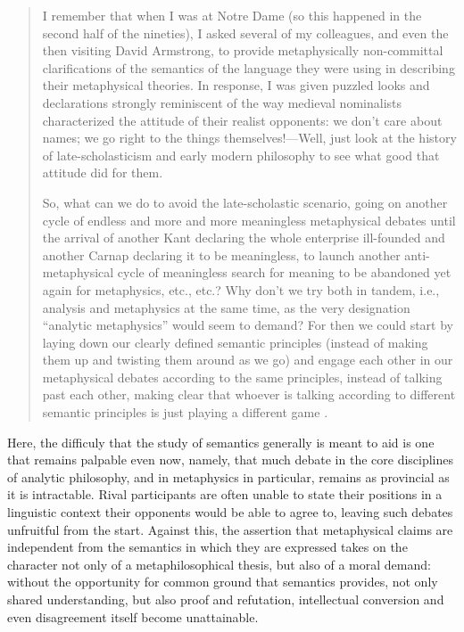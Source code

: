 \documentclass[]{article}
\begin{document}
\begin{quote}
I remember that when I was at Notre Dame (so this happened in the second
half of the nineties), I asked several of my colleagues, and even the then
visiting David Armstrong, to provide metaphysically non-committal
clarifications of the semantics of the language they were using in
describing their metaphysical theories. In response, I was given puzzled
looks and declarations strongly reminiscent of the way medieval
nominalists characterized the attitude of their realist opponents: we don’t
care about names; we go right to the things themselves!—Well, just look 
at the history of late-scholasticism and early modern philosophy to see
what good that attitude did for them.

So, what can we do to avoid the late-scholastic scenario, going on another
cycle of endless and more and more meaningless metaphysical debates
until the arrival of another Kant declaring the whole enterprise ill-founded
and another Carnap declaring it to be meaningless, to launch another anti-
metaphysical cycle of meaningless search for meaning to be abandoned
yet again for metaphysics, etc., etc.? Why don’t we try both in tandem,
i.e., analysis and metaphysics at the same time, as the very designation
“analytic metaphysics” would seem to demand? For then we could start by
laying down our clearly defined semantic principles (instead of making
them up and twisting them around as we go) and engage each other in our
metaphysical debates according to the same principles, instead of talking
past each other, making clear that whoever is talking according to different
semantic principles is just playing a different game \autocite[86-87]{Klima2014}.
\end{quote}

Here, the difficuly that the study of semantics generally is meant to aid is one that remains palpable even now, 
namely, that much debate in the core disciplines of analytic philosophy, 
and in metaphysics in particular, 
remains as provincial as it is intractable. 
Rival participants are often unable to state their positions in a linguistic context their opponents would be able to agree to, 
leaving such debates unfruitful from the start. 
Against this, the assertion that metaphysical claims are independent from the semantics in which they are expressed takes on the character not only of a metaphilosophical thesis, 
but also of a moral demand: 
without the opportunity for common ground that semantics provides, 
not only shared understanding, 
but also proof and refutation, 
intellectual conversion and even disagreement itself become unattainable.
\end{document}
